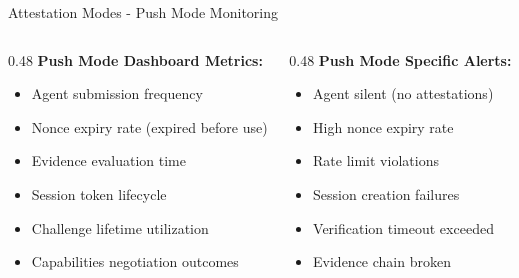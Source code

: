 \begin{frame}{Attestation Modes - Push Mode Monitoring}
  \scriptsize
  \begin{columns}[T]
    \begin{column}{0.48\textwidth}
      \textbf{Push Mode Dashboard Metrics:}
      \begin{itemize}
        \item Agent submission frequency
        \item Nonce expiry rate (expired before use)
        \item Evidence evaluation time
        \item Session token lifecycle
        \item Challenge lifetime utilization
        \item Capabilities negotiation outcomes
      \end{itemize}
    \end{column}
    \begin{column}{0.48\textwidth}
      \textbf{Push Mode Specific Alerts:}
      \begin{itemize}
        \item Agent silent (no attestations)
        \item High nonce expiry rate
        \item Rate limit violations
        \item Session creation failures
        \item Verification timeout exceeded
        \item Evidence chain broken
      \end{itemize}
    \end{column}
  \end{columns}
\end{frame}

